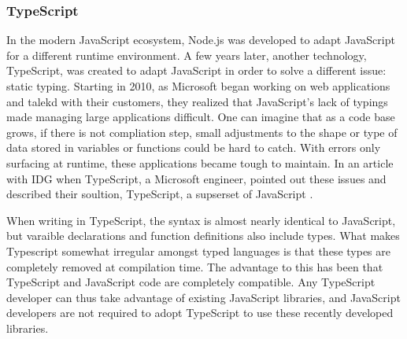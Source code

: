 \subsubsection{TypeScript}
In the modern JavaScript ecosystem, Node.js was developed to adapt JavaScript for a different runtime environment.  A few years later, another technology, TypeScript, was created to adapt JavaScript in order to solve a different issue: static typing.  Starting in 2010, as Microsoft began working on web applications and talekd with their customers, they realized that JavaScript's lack of typings made managing large applications difficult.  One can imagine that as a code base grows, if there is not compliation step, small adjustments to the shape or type of data stored in variables or functions could be hard to catch.  With errors only surfacing at runtime, these applications became tough to maintain.  In an article with IDG when TypeScript, a Microsoft engineer, pointed out these issues and described their soultion, TypeScript, a supserset of JavaScript \cite{idgnewsservicestaffMicrosoftAugmentsJavaScript2012}.

When writing in TypeScript, the syntax is almost nearly identical to JavaScript, but varaible declarations and function definitions also include types.  What makes Typescript somewhat irregular amongst typed languages is that these types are completely removed at compilation time. The advantage to this has been that TypeScript and JavaScript code are completely compatible.  Any TypeScript developer can thus take advantage of existing JavaScript libraries, and JavaScript developers are not required to adopt TypeScript to use these recently developed libraries.